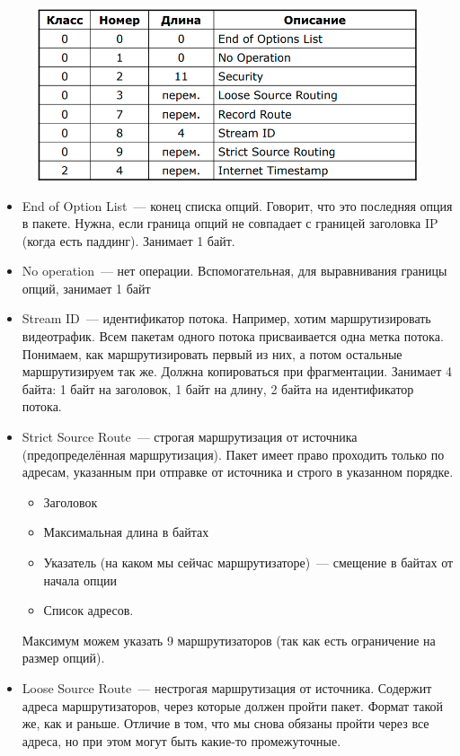 \begin{figure}[H]
  \centering
  \includegraphics[width=15cm]{images/02/05}
\end{figure}
\begin{itemize}
    \item End of Option List~--- конец списка опций. Говорит, что это последняя опция в пакете. Нужна, если граница опций не совпадает с границей заголовка IP (когда есть паддинг). Занимает 1 байт.
    \item No operation~--- нет операции. Вспомогательная, для выравнивания границы опций, занимает 1 байт
    \item Stream ID~--- идентификатор потока. Например, хотим маршрутизировать видеотрафик. Всем пакетам одного потока присваивается одна метка потока. Понимаем, как маршрутизировать первый из них, а потом остальные маршрутизируем так же. Должна копироваться при фрагментации. Занимает 4 байта: 1 байт на заголовок, 1 байт на длину, 2 байта на идентификатор потока.
    \item Strict Source Route~--- строгая маршрутизация от источника (предопределённая маршрутизация). Пакет имеет право проходить только по адресам, указанным при отправке от источника и строго в указанном порядке.
    \begin{itemize}
        \item Заголовок
        \item Максимальная длина в байтах
        \item Указатель (на каком мы сейчас маршрутизаторе)~--- смещение в байтах от начала опции
        \item Список адресов.
    \end{itemize}
    Максимум можем указать 9 маршрутизаторов (так как есть ограничение на размер опций).
    \item Loose Source Route~--- нестрогая маршрутизация от источника. Содержит адреса маршрутизаторов, через которые должен пройти пакет. Формат такой же, как и раньше. Отличие в том, что мы снова обязаны пройти через все адреса, но при этом могут быть какие-то промежуточные.


\end{itemize}
